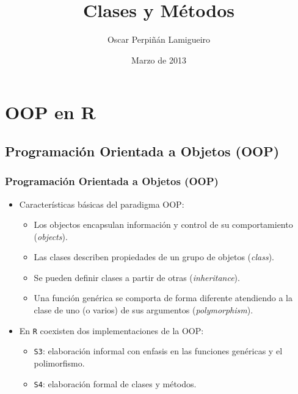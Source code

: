 \documentclass[xcolor={usenames,svgnames,dvipsnames}]{beamer}
\title{Clases y Métodos}
\author{Oscar Perpiñán Lamigueiro}
\date{Marzo de 2013}
\begin{document}
\maketitle



\section{OOP en R}
\label{sec-1}
\subsection{Programación Orientada a Objetos (OOP)}
\label{sec-1-1}
\begin{frame}
\frametitle{Programación Orientada a Objetos (OOP)}
\label{sec-1-1-1}

\begin{itemize}
\item Características básicas del paradigma OOP:
\begin{itemize}
\item Los objectos encapsulan información y control de su comportamiento (\emph{objects}).
\item Las clases describen propiedades de un grupo de objetos (\emph{class}).
\item Se pueden definir clases a partir de otras (\emph{inheritance}).
\item Una función genérica se comporta de forma diferente atendiendo a la
    clase de uno (o varios) de sus argumentos (\emph{polymorphism}).
\end{itemize}
\item En \texttt{R} coexisten dos implementaciones de la OOP:
\begin{itemize}
\item \texttt{S3}: elaboración informal con enfasis en las funciones genéricas y el polimorfismo.
\item \texttt{S4}: elaboración formal de clases y métodos.
\end{itemize}
\end{itemize}
\end{frame}
\end{document}
